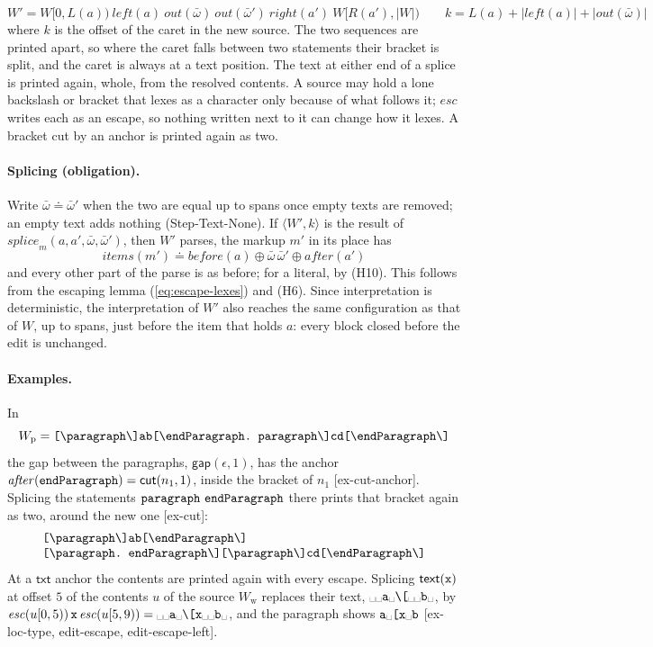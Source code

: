 \documentclass[11pt]{article}
\numberwithin{equation}{section}
\newcommand{\kw}[1]{\ensuremath{\mathsf{#1}}}
\newcommand{\str}[1]{\ensuremath{\text{\texttt{#1}}}}
\newcommand{\bs}{\textbackslash}
\newcommand{\vs}{\text{\textvisiblespace}}
\begin{document}
\[
W' = W[0, \mathit{L}(a))\ \mathit{left}(a)\ \mathit{out}(\bar\omega)\
  \mathit{out}(\bar\omega')\ \mathit{right}(a')\ W[\mathit{R}(a'), |W|)
\qquad
k = \mathit{L}(a) + |\mathit{left}(a)| + |\mathit{out}(\bar\omega)|
\]
where $k$ is the offset of the caret in the new source.  The two sequences
are printed apart, so where the caret falls between two statements their
bracket is split, and the caret is always at a text position.  The text at
either end of a splice is printed again, whole, from the resolved
contents.  A source may hold a lone backslash or bracket that
lexes as a character only because of what follows it; $\mathit{esc}$
writes each as an escape, so nothing written next to it can change how it
lexes.  A bracket cut by an anchor is printed again as two.

\paragraph{Splicing (obligation).}
Write $\bar\omega \doteq \bar\omega'$ when the two are equal up to spans
once empty texts are removed; an empty text adds nothing
(Step-Text-None).  If $\langle W', k \rangle$ is the result of
$\mathit{splice}_m(a, a', \bar\omega, \bar\omega')$, then $W'$ parses, the
markup $m'$ in its place has
\begin{equation}\label{eq:splice-items}
\mathit{items}(m') \doteq
  \mathit{before}(a) \oplus \bar\omega\,\bar\omega' \oplus \mathit{after}(a')
\end{equation}
and every other part of the parse is as before; for a literal, by (H10).
This follows from the escaping lemma (\ref{eq:escape-lexes}) and (H6).
Since interpretation is deterministic, the interpretation of $W'$ also
reaches the same configuration as that of $W$, up to spans, just before the
item that holds $a$: every block closed before the edit is unchanged.

\paragraph{Examples.}  In
\[
W_{\mathrm{p}} = \str{[\bs{}paragraph\bs]ab[\bs{}endParagraph.\
paragraph\bs]cd[\bs{}endParagraph\bs]}
\]
the gap between the paragraphs,
$\kw{gap}(\epsilon, 1)$, has the anchor $\mathit{after}(\str{endParagraph})
= \kw{cut}(n_1, 1)$, inside the bracket of $n_1$ [ex-cut-anchor].
Splicing the statements $\str{paragraph}\ \str{endParagraph}$ there prints
that bracket again as two, around the new one [ex-cut]:
\[
\begin{array}{@{}l@{}}
\str{[\bs{}paragraph\bs]ab[\bs{}endParagraph\bs]} \\
\str{[\bs{}paragraph.\ endParagraph\bs][\bs{}paragraph\bs]cd[\bs{}endParagraph\bs]}
\end{array}
\]
At a $\kw{txt}$ anchor the contents are printed again with every escape.
Splicing $\kw{text}(\str{x})$ at offset $5$ of the contents $u$ of the
source $W_{\mathrm{w}}$ replaces their text,
$\vs\vs\str{a}\vs\str{\bs[}\vs\vs\str{b}\vs$, by
$\mathit{esc}(u[0, 5))\,\str{x}\,\mathit{esc}(u[5, 9)) =
\vs\vs\str{a}\vs\str{\bs[x}\vs\vs\str{b}\vs$, and the paragraph shows
$\str{a}\vs\str{[x}\vs\str{b}$ [ex-loc-type, edit-escape,
edit-escape-left].
\end{document}
